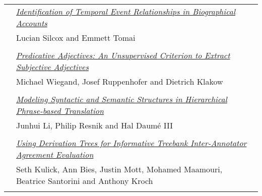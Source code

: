 \begin{tabular}{p{20mm}p{138mm}}
 & \hyperlink{page.529}{\em Identification of Temporal Event Relationships in Biographical Accounts}\\
         & Lucian Silcox and Emmett Tomai \\
\\

 & \hyperlink{page.534}{\em Predicative Adjectives: An Unsupervised Criterion to Extract Subjective Adjectives}\\
         & Michael Wiegand, Josef Ruppenhofer and Dietrich Klakow \\
\\

 & \hyperlink{page.540}{\em Modeling Syntactic and Semantic Structures in Hierarchical Phrase-based Translation}\\
         & Junhui Li, Philip Resnik and Hal Daum\'{e} III \\
\\

 & \hyperlink{page.550}{\em Using Derivation Trees for Informative Treebank Inter-Annotator Agreement Evaluation}\\
         & Seth Kulick, Ann Bies, Justin Mott, Mohamed Maamouri, Beatrice Santorini and Anthony Kroch \\
\\

\end{tabular}
\newpage
